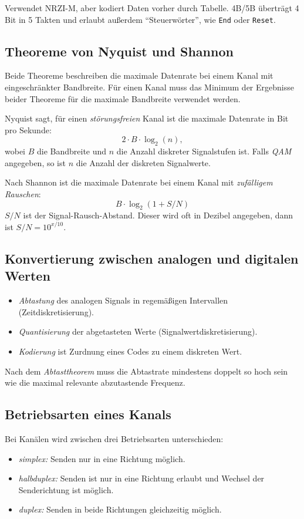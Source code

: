 \documentclass[a4paper,parskip=half*,DIV=15,fontsize=11pt]{scrartcl}
\begin{document}
Verwendet NRZI-M, aber kodiert Daten vorher durch Tabelle. 4B/5B überträgt 4 Bit in 5 Takten und erlaubt außerdem ``Steuerwörter'', wie \lstinline{End} oder \lstinline{Reset}.

\subsection{Theoreme von Nyquist und Shannon}

Beide Theoreme beschreiben die maximale Datenrate bei einem Kanal mit eingeschränkter Bandbreite. Für einen Kanal muss das Minimum der Ergebnisse beider Theoreme für die maximale Bandbreite verwendet werden.

Nyquist sagt, für einen \emph{störungsfreien} Kanal ist die maximale Datenrate in Bit pro Sekunde:
\[2 \cdot B \cdot \log_2(n),\] wobei $B$ die Bandbreite und $n$ die Anzahl diskreter Signalstufen ist. Falls \emph{QAM} angegeben, so ist $n$ die Anzahl der diskreten Signalwerte.

Nach Shannon ist die maximale Datenrate bei einem Kanal mit \emph{zufälligem Rauschen}:
\[B \cdot \log_2(1 + S/N)\]
$S/N$ ist der Signal-Rausch-Abstand. Dieser wird oft in Dezibel angegeben, dann ist $S/N = 10^{x/10}$.

\subsection{Konvertierung zwischen analogen und digitalen Werten}

\begin{itemize}
\item \emph{Abtastung} des analogen Signals in regemäßigen Intervallen (Zeitdiskretisierung).
\item \emph{Quantisierung} der abgetasteten Werte (Signalwertdiskretisierung).
\item \emph{Kodierung} ist Zurdnung eines Codes zu einem diskreten Wert.
\end{itemize}

Nach dem \emph{Abtasttheorem} muss die Abtastrate mindestens doppelt so hoch sein wie die maximal relevante abzutastende Frequenz.

\subsection{Betriebsarten eines Kanals}

Bei Kanälen wird zwischen drei Betriebsarten unterschieden:

\begin{itemize}
\item \emph{simplex:} Senden nur in eine Richtung möglich.
\item \emph{halbduplex:} Senden ist nur in eine Richtung erlaubt und Wechsel der Senderichtung ist möglich.
\item \emph{duplex:} Senden in beide Richtungen gleichzeitig möglich.
\end{itemize}
\end{document}

